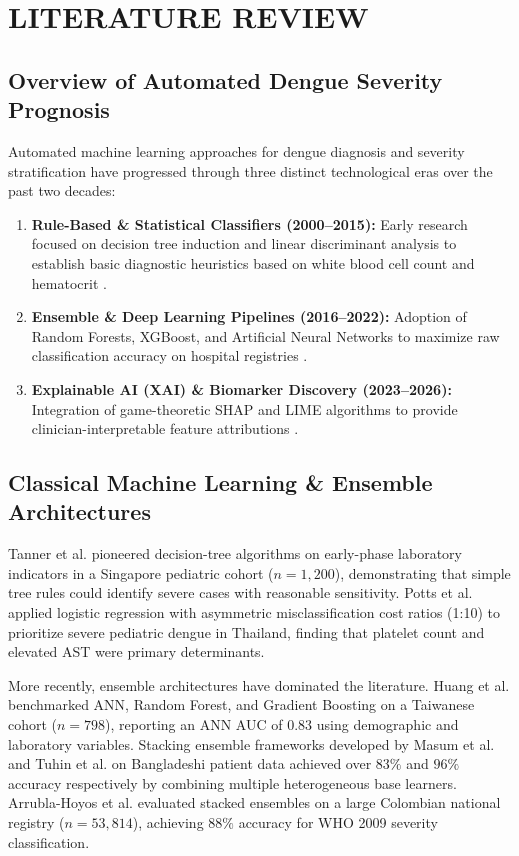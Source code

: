 \documentclass[12pt, a4paper]{report}
\begin{document}
\chapter{LITERATURE REVIEW}

\section{Overview of Automated Dengue Severity Prognosis}
Automated machine learning approaches for dengue diagnosis and severity stratification have progressed through three distinct technological eras over the past two decades:
\begin{enumerate}
    \item \textbf{Rule-Based \& Statistical Classifiers (2000--2015):} Early research focused on decision tree induction and linear discriminant analysis to establish basic diagnostic heuristics based on white blood cell count and hematocrit \cite{tanner2008, potts2010}.
    \item \textbf{Ensemble \& Deep Learning Pipelines (2016--2022):} Adoption of Random Forests, XGBoost, and Artificial Neural Networks to maximize raw classification accuracy on hospital registries \cite{huang2020, chowdhury2022}.
    \item \textbf{Explainable AI (XAI) \& Biomarker Discovery (2023--2026):} Integration of game-theoretic SHAP and LIME algorithms to provide clinician-interpretable feature attributions \cite{masum2025, tuhin2025, niazi2026}.
\end{enumerate}

\section{Classical Machine Learning \& Ensemble Architectures}
Tanner et al. \cite{tanner2008} pioneered decision-tree algorithms on early-phase laboratory indicators in a Singapore pediatric cohort ($n=1,200$), demonstrating that simple tree rules could identify severe cases with reasonable sensitivity. Potts et al. \cite{potts2010} applied logistic regression with asymmetric misclassification cost ratios (1:10) to prioritize severe pediatric dengue in Thailand, finding that platelet count and elevated AST were primary determinants.

More recently, ensemble architectures have dominated the literature. Huang et al. \cite{huang2020} benchmarked ANN, Random Forest, and Gradient Boosting on a Taiwanese cohort ($n=798$), reporting an ANN AUC of $0.83$ using demographic and laboratory variables. Stacking ensemble frameworks developed by Masum et al. \cite{masum2025} and Tuhin et al. \cite{tuhin2025} on Bangladeshi patient data achieved over $83\%$ and $96\%$ accuracy respectively by combining multiple heterogeneous base learners. Arrubla-Hoyos et al. \cite{arrubla2023} evaluated stacked ensembles on a large Colombian national registry ($n=53,814$), achieving $88\%$ accuracy for WHO 2009 severity classification.
\end{document}
